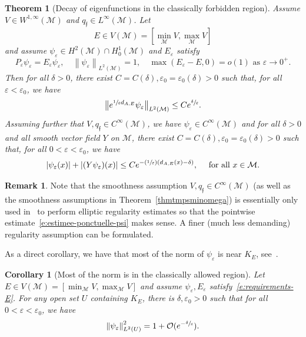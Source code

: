 \documentclass[10pt]{amsart}
\newcommand{\Psfrac}[2]{(\sfrac{#1}{#2})}
\newtheorem{theorem}[lemma]{Theorem}
\newtheorem{corollary}[lemma]{Corollary}
\theoremstyle{definition}
\newtheorem{remark}[lemma]{Remark}
\newcommand{\M}{\ensuremath{\mathcal M}}
\newcommand\grandon[1]{\mathcal{O}(#1)}
\newcommand{\f}{\ensuremath{\mathfrak{f}}}
\newcommand\nor[2]{\left\|#1\right\|_{#2}}
\newcommand\bnor[2]{\bigl\|#1\bigr\|_{#2}}
\let\eps\varepsilon
\newcommand{\qf}{q_{\f}}
\begin{document}
\begin{theorem}[Decay of eigenfunctions in the classically forbidden region]
\label{t:decay-agmon}
Assume $V \in W^{1,\infty}(\M)$ and $\qf \in L^\infty(\M)$. Let
\[
E \in V(\M) = [\min_\M V, \max_\M V]
\]
and assume $\psi_\eps \in H^2(\M) \cap H^1_0(\M)$ and $E_\eps$ satisfy
\begin{equation}
\label{e:requirements-E}
P_\eps \psi_\eps = E_\eps \psi_\eps, \quad \nor{\psi_\eps}{L^2(\M)} = 1, \quad \max(E_\eps -E, 0) = o(1) \text{ as } \eps \to 0^+.
\end{equation}
Then for all $\delta>0$, there exist $C=C(\delta),\eps_0=\eps_0(\delta)>0$ such that, for all $\eps<\eps_0$, we have
\begin{equation}
\label{e:estimee-L2-psi}
\bnor{ e^{\sfrac{1}{\eps} d_{A,E}} \psi_\eps}{L^2(\M)}\leq C e^{\sfrac{\delta}{\eps}}.
\end{equation}
Assuming further that $V, \qf \in C^\infty(\M)$, we have $\psi_\eps \in C^\infty(\M)$ and for all $\delta>0$ and all smooth vector field $Y$ on $\M$, there exist $C=C(\delta),\eps_0=\eps_0(\delta)>0$ such that, for all $0<\eps<\eps_0$, we have
\begin{equation}
\label{e:estimee-ponctuelle-psi}
|\psi_\eps(x)| + |(Y\psi_\eps)(x)| \leq C e^{-\Psfrac{1}{\eps} (d_{A,E}(x)-\delta)}, \quad \text{ for all } x \in \M.
\end{equation}
\end{theorem}
\begin{remark}
\label{r:Cinfty-reg-bdry}
Note that the smoothness assumption $V, \qf \in C^\infty(\M)$ (as well as the smoothness assumptions in Theorem~\ref{thmtmpsminomega}) is essentially only used in~\cite{HS84,Helffer:booksemiclassic,DS:book} to perform elliptic regularity estimates so that the pointwise estimate~\eqref{e:estimee-ponctuelle-psi} makes sense. A finer (much less demanding) regularity assumption can be formulated.
\end{remark}

As a direct corollary, we have that most of the norm of $\psi_\eps$ is near $K_E$, see~\cite[Cor.\,3.3.2]{Helffer:booksemiclassic}.
\begin{corollary}[Most of the norm is in the classically allowed region]
\label{corpresx0omega}
Let $E \in V(\M) = [\min_\M V, \max_\M V]$ and assume $\psi_\eps, E_\eps$ satisfy~\eqref{e:requirements-E}.
For any open set $U$ containing $K_E$, there is $\delta, \eps_0 >0$ such that for all $0<\eps< \eps_0$, we have
\[
\nor{\psi_\eps}{L^2(U)}^2 = 1 + \grandon{e^{-\sfrac{\delta}{\eps}}}.
\]
\end{corollary}
\end{document}
